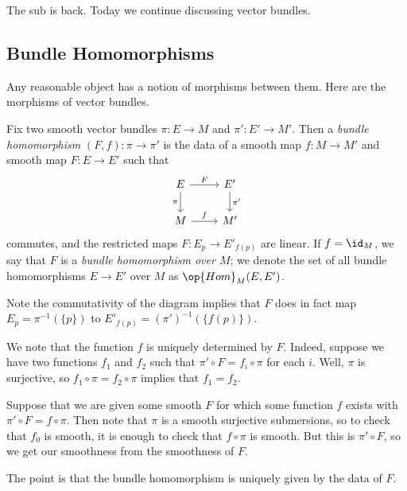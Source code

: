 \documentclass[../notes.tex]{subfiles}
\begin{document}
The sub is back. Today we continue discussing vector bundles.

\subsection{Bundle Homomorphisms}
Any reasonable object has a notion of morphisms between them. Here are the morphisms of vector bundles.
\begin{definition}
	Fix two smooth vector bundles $\pi\colon E\to M$ and $\pi'\colon E'\to M'$. Then a \textit{bundle homomorphism} $(F,f)\colon\pi\to\pi'$ is the data of a smooth map $f\colon M\to M'$ and smooth map $F\colon E\to E'$ such that
	\[\begin{tikzcd}
		E & {E'} \\
		M & {M'}
		\arrow["f", from=2-1, to=2-2]
		\arrow["F", from=1-1, to=1-2]
		\arrow["\pi"', from=1-1, to=2-1]
		\arrow["{\pi'}", from=1-2, to=2-2]
	\end{tikzcd}\]
	commutes, and the restricted maps $F\colon E_p\to E'_{f(p)}$ are linear. If $f=\id_M$, we say that $F$ is a \textit{bundle homomorphism over $M$}; we denote the set of all bundle homomorphisms $E\to E'$ over $M$ as $\op{Hom}_M(E,E')$.
\end{definition}
\begin{remark}
	Note the commutativity of the diagram implies that $F$ does in fact map $E_p=\pi^{-1}(\{p\})$ to $E'_{f(p)}=(\pi')^{-1}(\{f(p)\})$.
\end{remark}
\begin{remark}
	We note that the function $f$ is uniquely determined by $F$. Indeed, suppose we have two functions $f_1$ and $f_2$ such that $\pi'\circ F=f_i\circ\pi$ for each $i$. Well, $\pi$ is surjective, so $f_1\circ\pi=f_2\circ\pi$ implies that $f_1=f_2$.
\end{remark}
\begin{remark}
	Suppose that we are given some smooth $F$ for which some function $f$ exists with $\pi'\circ F=f\circ\pi$. Then note that $\pi$ is a smooth surjective submersions, so to check that $f_0$ is smooth, it is enough to check that $f\circ\pi$ is smooth. But this is $\pi'\circ F$, so we get our smoothness from the smoothness of $F$.
\end{remark}
The point is that the bundle homomorphism is uniquely given by the data of $F$.
\end{document}
